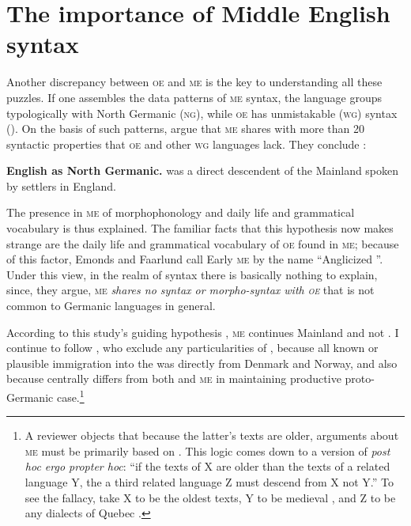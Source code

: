 \documentclass[output=paper]{LSP/langsci}
\begin{document}
\section{The importance of Middle English syntax}\label{sec:emonds:3} 
  Another discrepancy between \textsc{oe} and \textsc{me} is the key to understanding all these puzzles. If one assembles the data patterns of \textsc{me} syntax, the language groups typologically with North Germanic (\textsc{ng}), while \textsc{oe} has unmistakable  (\textsc{wg}) syntax (\citealt[133]{GianolloEtAl2008}). On the basis of such patterns, \citet{EmondsFaarlund2014} argue that \textsc{me} shares with  more than 20 syntactic properties that \textsc{oe} and other \textsc{wg} languages lack. They conclude :

\ea \label{ex:emonds:1}%
 

      \textbf{English as North Germanic.}  was a direct descendent of the Mainland  spoken by  settlers in England.
    \z

The presence in \textsc{me} of  morphophonology and daily life and grammatical vocabulary is thus explained. The familiar facts that this hypothesis now makes strange are the daily life and grammatical vocabulary of \textsc{oe} found in \textsc{me}; because of this factor, Emonds and Faarlund call Early \textsc{me} by the name “Anglicized ”. Under this view, in the realm of syntax there is basically nothing to explain, since, they argue, \textsc{me} \textit{shares no syntax or morpho-syntax with \textsc{oe}} that is not common to Germanic languages in general.

According to this study’s guiding hypothesis , \textsc{me} continues Mainland  and not . I continue to follow \citet[Ch.1, p.127]{EmondsFaarlund2014}, who exclude any particularities of , because all known or plausible  immigration into the  was directly from Denmark and Norway, and also because  centrally differs from both  and \textsc{me} in maintaining productive proto-Germanic  case.\footnote{A reviewer objects that because the latter’s texts are older, arguments about \textsc{me} must be primarily based on . This logic comes down to a version of \textit{post hoc ergo propter hoc}: ``if the texts of X are older than the texts of a related language Y, the a third related language Z must descend from X not Y.'' To see the fallacy, take X to be the oldest  texts, Y to be medieval , and Z to be any dialects of Quebec .} 
\end{document}
